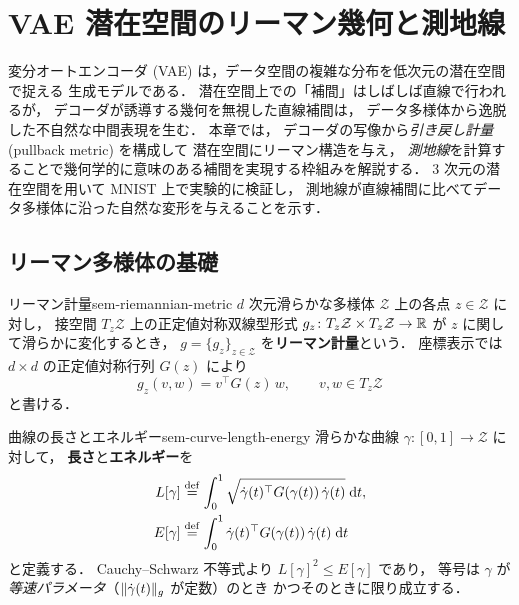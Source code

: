 \chapter{VAE 潜在空間のリーマン幾何と測地線}
\label{ch:seminar-04-vae}

変分オートエンコーダ (VAE) は，データ空間の複雑な分布を低次元の潜在空間で捉える
生成モデルである．
潜在空間上での「補間」はしばしば直線で行われるが，
デコーダが誘導する幾何を無視した直線補間は，
データ多様体から逸脱した不自然な中間表現を生む．
本章では，
デコーダの写像から\emph{引き戻し計量} (pullback metric) を構成して
潜在空間にリーマン構造を与え，
\emph{測地線}を計算することで幾何学的に意味のある補間を実現する枠組みを解説する．
3 次元の潜在空間を用いて MNIST 上で実験的に検証し，
測地線が直線補間に比べてデータ多様体に沿った自然な変形を与えることを示す．

\section{リーマン多様体の基礎}
\label{sec:sem-riemannian-basics}

\begin{definition}{リーマン計量}{sem-riemannian-metric}
  $d$ 次元滑らかな多様体 $\mathcal{Z}$ 上の各点 $z \in \mathcal{Z}$ に対し，
  接空間 $T_z\mathcal{Z}$ 上の正定値対称双線型形式
  $g_z \colon T_z\mathcal{Z} \times T_z\mathcal{Z} \to \mathbb{R}$
  が $z$ に関して滑らかに変化するとき，
  $g = \{g_z\}_{z \in \mathcal{Z}}$ を\textbf{リーマン計量}という．
  座標表示では $d \times d$ の正定値対称行列 $G(z)$ により
  \[
    g_z(v, w) = v^\top G(z)\, w, \qquad v, w \in T_z\mathcal{Z}
  \]
  と書ける．
\end{definition}

\begin{definition}{曲線の長さとエネルギー}{sem-curve-length-energy}
  滑らかな曲線 $\gamma \colon [0,1] \to \mathcal{Z}$ に対して，
  \textbf{長さ}と\textbf{エネルギー}を
  \begin{align}
    L[\gamma] &\overset{\mathrm{def}}{=} \int_0^1 \sqrt{\dot{\gamma}(t)^\top G(\gamma(t))\, \dot{\gamma}(t)} \;\mathrm{d} t, \label{eq:curve-length} \\
    E[\gamma] &\overset{\mathrm{def}}{=} \int_0^1 \dot{\gamma}(t)^\top G(\gamma(t))\, \dot{\gamma}(t) \;\mathrm{d} t \label{eq:curve-energy}
  \end{align}
  と定義する．
  Cauchy--Schwarz 不等式より $L[\gamma]^2 \le E[\gamma]$ であり，
  等号は $\gamma$ が\emph{等速パラメータ}（$\lVert \dot{\gamma}(t) \rVert_g$ が定数）のとき
  かつそのときに限り成立する．
\end{definition}

